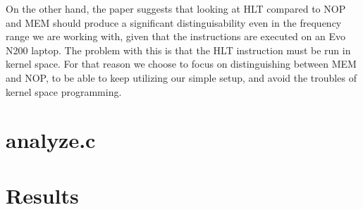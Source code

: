On the other hand, the paper suggests that looking at HLT compared to NOP and MEM should produce a significant distinguisability even in the frequency range we are working with, given that the instructions are executed on an Evo N200 laptop.
The problem with this is that the HLT instruction must be run in kernel space.
For that reason we choose to focus on distinguishing between MEM and NOP, to be able to keep utilizing our simple setup, and avoid the troubles of kernel space programming.

\section{analyze.c}\label{sec:ch4_analyse}


\section{Results}\label{sec:ch4_results}